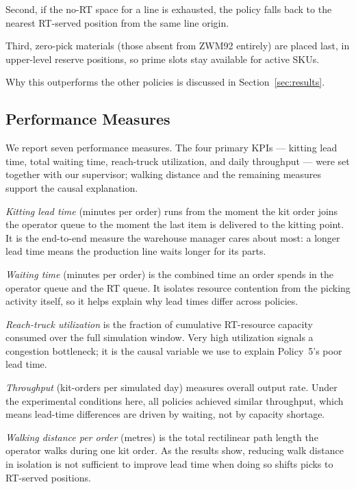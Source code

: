 Second, if the no-RT space for a line is exhausted, the policy falls back to
the nearest RT-served position from the same line origin.

Third, zero-pick materials (those absent from ZWM92 entirely) are placed last,
in upper-level reserve positions, so prime slots stay available for active
SKUs.

Why this outperforms the other policies is discussed in
Section~\ref{sec:results}.

\subsection{Performance Measures}\label{sec:kpis}

We report seven performance measures. The four primary KPIs --- kitting lead
time, total waiting time, reach-truck utilization, and daily throughput ---
were set together with our supervisor; walking distance and the remaining
measures support the causal explanation.

\emph{Kitting lead time} (minutes per order) runs from the moment the kit
order joins the operator queue to the moment the last item is delivered to the
kitting point. It is the end-to-end measure the warehouse manager cares about
most: a longer lead time means the production line waits longer for its parts.

\emph{Waiting time} (minutes per order) is the combined time an order spends
in the operator queue and the RT queue. It isolates resource contention from
the picking activity itself, so it helps explain why lead times differ across
policies.

\emph{Reach-truck utilization} is the fraction of cumulative RT-resource
capacity consumed over the full simulation window. Very high utilization
signals a congestion bottleneck; it is the causal variable we use to explain
Policy~5's poor lead time.

\emph{Throughput} (kit-orders per simulated day) measures overall output rate.
Under the experimental conditions here, all policies achieved similar
throughput, which means lead-time differences are driven by waiting, not by
capacity shortage.

\emph{Walking distance per order} (metres) is the total rectilinear path
length the operator walks during one kit order. As the results show, reducing
walk distance in isolation is not sufficient to improve lead time when doing so
shifts picks to RT-served positions.

